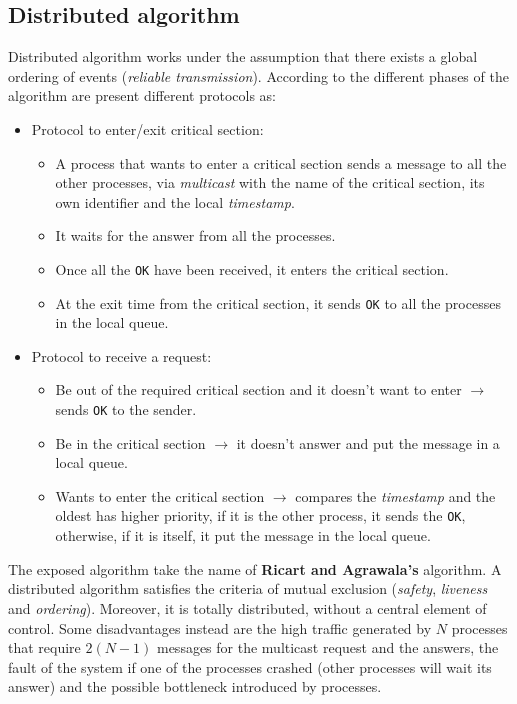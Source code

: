 \subsection{Distributed algorithm}
Distributed algorithm works under the assumption that there exists a global ordering of events (\textit{reliable transmission}).
According to the different phases of the algorithm are present different protocols as:
\begin{itemize}
	\item Protocol to enter/exit critical section:
		\begin{itemize}
			\item A process that wants to enter a critical section sends a message to all the other processes, via \textit{multicast} with the name of the critical section, its own identifier and the local \textit{timestamp}.
			\item It waits for the answer from all the processes.
			\item Once all the \verb|OK| have been received, it enters the critical section.
			\item At the exit time from the critical section, it sends \verb|OK| to all the processes in the local queue. 
		\end{itemize}
	\item Protocol to receive a request:
		\begin{itemize}
			\item Be out of the required critical section and it doesn't want to enter $\rightarrow$ sends \verb|OK| to the sender.
			\item Be in the critical section $\rightarrow$ it doesn't answer and put the message in a local queue.
			\item Wants to enter the critical section $\rightarrow$ compares the \textit{timestamp} and the oldest has higher priority, if it is the other process, it sends the \verb|OK|, otherwise, if it is itself, it put the message in the local queue.
		\end{itemize}
\end{itemize}
The exposed algorithm take the name of \textbf{Ricart and Agrawala's} algorithm.
A distributed algorithm satisfies the criteria of mutual exclusion (\textit{safety}, \textit{liveness} and \textit{ordering}). Moreover, it is totally distributed, without a central element of control.
Some disadvantages instead are the high traffic generated by $N$ processes that require $2(N-1)$ messages for the multicast request and the answers,
the fault of the system if one of the processes crashed (other processes will
wait its answer) and the possible bottleneck introduced by processes.

